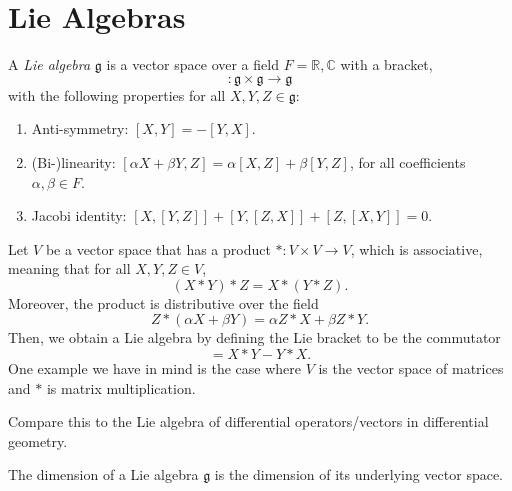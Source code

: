\chapter{Lie Algebras}%
\label{cha:lie_algebras}

\begin{definition} \label{def:lie_algebra}
  A \emph{Lie algebra} $\mathfrak{g}$ is a vector space over a field $F = \mathbb{R}, \mathbb{C}$ with a bracket, 
  \begin{equation}
    [, ]: \mathfrak{g} \times \mathfrak{g} \to \mathfrak{g}
  \end{equation}
  with the following properties for all $X, Y, Z \in \mathfrak{g}$:
  \begin{enumerate}
    \item Anti-symmetry: $[X, Y] = -[Y, X]$.
    \item (Bi-)linearity: $[\alpha X + \beta Y, Z] = \alpha[X, Z] + \beta [Y, Z]$, for all coefficients $\alpha, \beta \in F$.
    \item Jacobi identity: $[X, [Y, Z] ] + [Y, [Z, X] ] + [Z, [X, Y] ] = 0$.
  \end{enumerate}
\end{definition}

Let $V$ be a vector space that has a product $*: V \times V \to V$, which is associative, meaning that for all $X, Y, Z \in V$,
\begin{equation}
  (X * Y) * Z = X*(Y*Z).
\end{equation}
Moreover, the product is distributive over the field
\begin{equation}
  Z * (\alpha X + \beta Y) = \alpha Z*X + \beta Z*Y.
\end{equation}
Then, we obtain a Lie algebra by defining the Lie bracket to be the commutator
\begin{equation}
  [X, Y] = X*Y - Y*X.
\end{equation}
One example we have in mind is the case where $V$ is the vector space of matrices and $*$ is matrix multiplication. 
\begin{leftbar}
  \begin{remark}
    Compare this to the Lie algebra of differential operators/vectors in differential geometry.
  \end{remark}
\end{leftbar}

\begin{definition}[dimension]
  The dimension of a Lie algebra $\mathfrak{g}$ is the dimension of its underlying vector space.
\end{definition}

